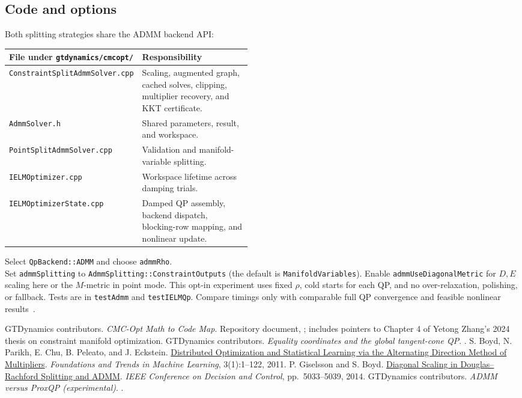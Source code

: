 \documentclass[11pt,letterpaper]{article}
\newcommand{\code}[1]{\texttt{\small #1}}
\begin{document}
\subsection{Code and options}
Both splitting strategies share the ADMM backend API:
\begin{center}
\small
\begin{tabularx}{\linewidth}{@{}p{0.47\linewidth}X@{}}
\toprule
File under \code{gtdynamics/cmcopt/} & Responsibility \\
\midrule
\code{ConstraintSplitAdmmSolver.cpp} & Scaling, augmented graph, cached solves,
clipping, multiplier recovery, and KKT certificate. \\
\code{AdmmSolver.h} & Shared parameters, result, and workspace. \\
\code{PointSplitAdmmSolver.cpp} & Validation and manifold-variable splitting. \\
\code{IELMOptimizer.cpp} & Workspace lifetime across damping trials. \\
\code{IELMOptimizerState.cpp} & Damped QP assembly, backend dispatch,
blocking-row mapping, and nonlinear update. \\
\bottomrule
\end{tabularx}
\end{center}
Select \code{QpBackend::ADMM} and choose \code{admmRho}.\\
Set \code{admmSplitting} to \code{AdmmSplitting::ConstraintOutputs}
(the default is \code{ManifoldVariables}). Enable \code{admmUseDiagonalMetric}
for $D,E$ scaling here or the $M$-metric in point mode.
This opt-in experiment uses fixed $\rho$, cold starts for each QP, and no
over-relaxation, polishing, or fallback. Tests are in \code{testAdmm}
and \code{testIELMQp}. Compare timings only with comparable full QP convergence
and feasible nonlinear results~\cite{experiment}.

\begingroup
\small
\raggedright
\setlength{\parskip}{0pt}
\begin{thebibliography}{5}
 GTDynamics contributors.
\emph{CMC-Opt Math to Code Map}. Repository document,
; includes pointers to Chapter 4 of
Yetong Zhang's 2024 thesis on constraint manifold optimization.
 GTDynamics contributors.
\emph{Equality coordinates and the global tangent-cone QP}.
.
 S. Boyd, N. Parikh, E. Chu, B. Peleato, and J. Eckstein.
\href{https://web.stanford.edu/~boyd/papers/admm_distr_stats.html}
{Distributed Optimization and Statistical Learning via the Alternating
Direction Method of Multipliers}.
\emph{Foundations and Trends in Machine Learning}, 3(1):1--122, 2011.
 P. Giselsson and S. Boyd.
\href{https://web.stanford.edu/~boyd/papers/diag_scaling_DR_ADMM.html}
{Diagonal Scaling in Douglas--Rachford Splitting and ADMM}.
\emph{IEEE Conference on Decision and Control}, pp.\ 5033--5039, 2014.
 GTDynamics contributors.
\emph{ADMM versus ProxQP (experimental)}.
.
\end{thebibliography}
\endgroup
\end{document}
